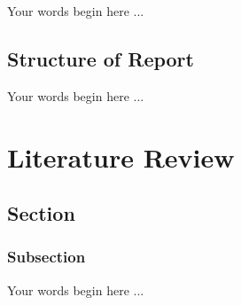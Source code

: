 \documentclass{ecsthesis}       %
\begin{document}
Your words begin here ...

\section{Structure of Report}\label{structure-of-report}

Your words begin here ...


\chapter{Literature Review} \label{Chapter:LiteratureReview}


\section{Section}\label{section}


\subsection{Subsection}\label{subsection}

Your words begin here ... \cite{vihman1994word}
\end{document}
